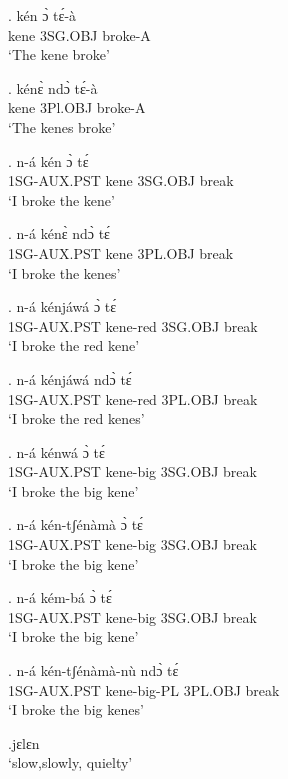 \documentclass{assets/fieldnotes}
\begin{document}
{\exg. kén ɔ̀ tɛ́-à\\
kene 3SG.OBJ broke-A\\
`The kene broke'

\exg. kénɛ̀ ndɔ̀ tɛ́-à\\
kene 3Pl.OBJ broke-A\\
`The kenes broke'

\exg. n-á kén ɔ̀ tɛ́\\
1SG-AUX.PST kene 3SG.OBJ break\\
`I broke the kene'

\exg. n-á kénɛ̀ ndɔ̀ tɛ́\\
1SG-AUX.PST kene 3PL.OBJ break\\
`I broke the kenes'

\exg. n-á kénjáwá ɔ̀ tɛ́\\
1SG-AUX.PST kene-red 3SG.OBJ break\\
`I broke the red kene'

\exg. n-á kénjáwá ndɔ̀ tɛ́\\
1SG-AUX.PST kene-red 3PL.OBJ break\\
`I broke the red kenes'


\exg. n-á kénwá ɔ̀ tɛ́\\
1SG-AUX.PST kene-big 3SG.OBJ break\\
`I broke the big kene'

\exg. n-á kén-tʃénàmà ɔ̀ tɛ́\\
1SG-AUX.PST kene-big 3SG.OBJ break\\
`I broke the big kene'

\exg. n-á kém-bá ɔ̀ tɛ́\\
1SG-AUX.PST kene-big 3SG.OBJ break\\
`I broke the big kene'


\exg. n-á kén-tʃénàmà-nù ndɔ̀ tɛ́\\
1SG-AUX.PST kene-big-PL 3PL.OBJ break\\
`I broke the big kenes'


\jf{}

\ex.jɛlɛn\\
`slow,slowly, quielty' 


}
\end{document}
